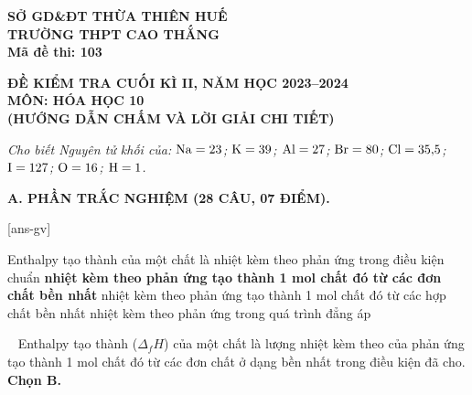\documentclass[12pt,a4paper]{article}
\renewcommand{\loigiai}[1]{%
  \par\smallskip\noindent{\color{blue!80!black}\textbf{Lời giải:}}\ #1\par\smallskip
}
\renewcommand{\True}{\bfseries\color{red!80!black}}
\begin{document}
\thispagestyle{firstpage}

\noindent
\begin{minipage}[t]{0.40\textwidth}
	\centering\fontsize{9.5pt}{12pt}\selectfont
	\textbf{SỞ GD\&ĐT THỪA THIÊN HUẾ}\\
	\textbf{TRƯỜNG THPT CAO THẮNG}\\
	\textbf{Mã đề thi: 103}
\end{minipage}\hfill
\begin{minipage}[t]{0.58\textwidth}
	\centering\small
	\textbf{ĐỀ KIỂM TRA CUỐI KÌ II, NĂM HỌC 2023--2024}\\
	\textbf{MÔN: HÓA HỌC 10}\\
	\textbf{\color{red!80!black}(HƯỚNG DẪN CHẤM VÀ LỜI GIẢI CHI TIẾT)}
\end{minipage}

\smallskip
\noindent
\textit{Cho biết Nguyên tử khối của: $\ce{Na}=23$; $\ce{K}=39$; $\ce{Al}=27$; $\ce{Br}=80$; $\ce{Cl}=35{,}5$; $\ce{I}=127$; $\ce{O}=16$; $\ce{H}=1$.}

\smallskip
\noindent
\textbf{A. PHẦN TRẮC NGHIỆM (28 CÂU, 07 ĐIỂM).}

[ans-gv]

\begin{ex}
Enthalpy tạo thành của một chất là
\choice
{nhiệt kèm theo phản ứng trong điều kiện chuẩn}
{\True nhiệt kèm theo phản ứng tạo thành 1 mol chất đó từ các đơn chất bền nhất}
{nhiệt kèm theo phản ứng tạo thành 1 mol chất đó từ các hợp chất bền nhất}
{nhiệt kèm theo phản ứng trong quá trình đẳng áp}
\loigiai{
Enthalpy tạo thành ($\Delta_f H$) của một chất là lượng nhiệt kèm theo của phản ứng tạo thành 1 mol chất đó từ các đơn chất ở dạng bền nhất trong điều kiện đã cho.\\
\textbf{Chọn B.}
}
\end{ex}
\end{document}
